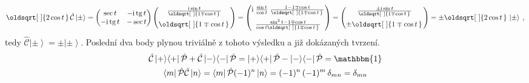 \documentclass[10pt,a4paper]{article}
\renewcommand*{\sqrt}[2][\ ]{\oldsqrt[#1]{#2\,}\,}
\newcommand{\const}[1]{\text{#1}}
\newcommand{\mat}[1]{
    \begin{pmatrix}
        #1
    \end{pmatrix}
}
\newcommand{\bra}[1]{\left< #1 \right|}
\newcommand{\ket}[1]{\left| #1 \right>}
\renewcommand{\i}{\const{i}}
\def\tg{\operatorname{tg}}
\def\1{\mathbbm{1}}
\def\Parity{\hat{\mathcal P}}
\def\Cop{\hat{\mathcal C}}
\begin{document}
\begin{align*}
    \sqrt{2\cos t} \Cop \ket\pm
    =
    \mat{
        \sec t & -\i\tg t \\
        -\i\tg t & -\sec t
    }
    \mat{
        \frac{\i \sin t}{\sqrt{1 \mp \cos t}} \\[7pt]
        \sqrt{1 \mp \cos t}
    }
    =
    \mat{
        \i \; \frac{\sin t}{\cos t} \; \frac{1 - 1 \mp \cos t}{\sqrt{1 \mp \cos t}} \\[7pt]
        \frac{\sin^2 t - 1 \mp \cos t}{\cos t \sqrt{1 \mp \cos t}}
    }
    =
    \mat{
        \frac{\pm \i \sin t}{\sqrt{1 \mp \cos t}} \\[7pt]
        \pm \sqrt{1 \mp \cos t}
    }
    =
    \pm \sqrt{2\cos t} \ket\pm \: ,
\end{align*}
tedy $\Cop\ket\pm=\pm\ket\pm$. Poslední dva body plynou triviálně z tohoto výsledku a již dokázaných tvrzení.
\begin{gather*}
    \Cop\ket{+}\!\bra{+}\Parity + \Cop\ket{-}\!\bra{-}\Parity
    = \ket{+}\!\bra{+}\Parity - \ket{-}\!\bra{-}\Parity = \1
    \\
    \bra{m} \Parity \Cop \ket{n} = \bra{m} \Parity (-1)^n \ket{n} = (-1)^n \, (-1)^m \, \delta_{mn} = \delta_{mn}
\end{gather*}
\end{document}
